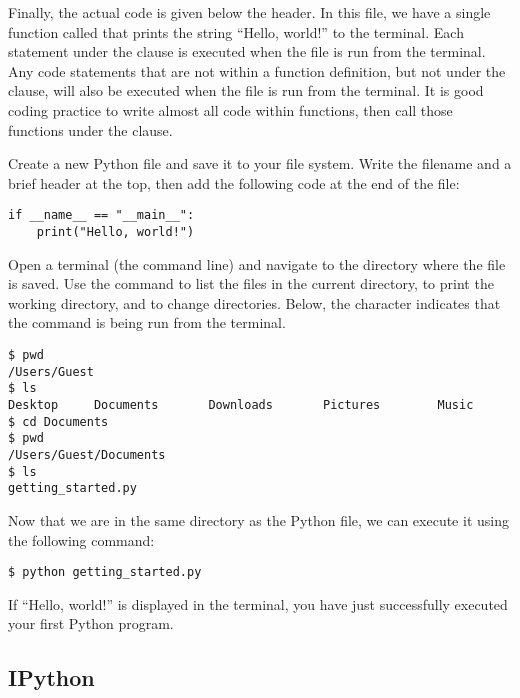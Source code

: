 Finally, the actual code is given below the header.
In this file, we have a single function called  that prints the string ``Hello, world!'' to the terminal.
Each statement under the  clause is executed when the file is run from the terminal.
Any code statements that are not within a function definition, but not under the  clause, will also be executed when the file is run from the terminal.
It is good coding practice to write almost all code within functions, then call those functions under the  clause.

\begin{problem} %
Create a new Python file and save it to your file system.
Write the filename and a brief header at the top, then add the following code at the end of the file:
\begin{lstlisting}
if __name__ == "__main__":
    print("Hello, world!")
\end{lstlisting}

Open a terminal (the command line) and navigate to the directory where the file is saved.
Use the  command to list the files in the current directory,  to print the working directory, and  to change directories.
Below, the \li{\$} character indicates that the command is being run from the terminal.

\begin{lstlisting}
$ pwd
/Users/Guest
$ ls
Desktop     Documents       Downloads       Pictures        Music
$ cd Documents
$ pwd
/Users/Guest/Documents
$ ls
getting_started.py
\end{lstlisting}

Now that we are in the same directory as the Python file, we can execute it using the following command:

\begin{lstlisting}
$ python getting_started.py
\end{lstlisting}

If ``Hello, world!'' is displayed in the terminal, you have just successfully executed your first Python program.
\label{prob:helloWorld}
\end{problem}

\subsection*{IPython} %

